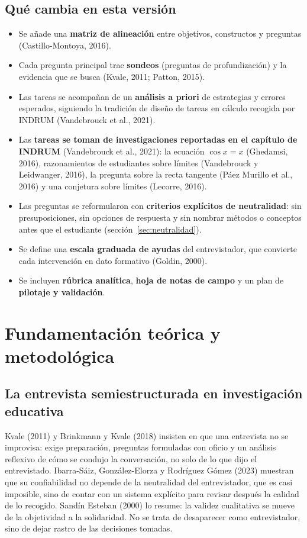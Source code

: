 \documentclass[11pt,letterpaper]{article}
\newcounter{preg}
\begin{document}
\subsection*{Qué cambia en esta versión}
\begin{itemize}
  \item Se añade una \textbf{matriz de alineación} entre objetivos, constructos y preguntas (Castillo-Montoya, 2016).
  \item Cada pregunta principal trae \textbf{sondeos} (preguntas de profundización) y la evidencia que se busca (Kvale, 2011; Patton, 2015).
  \item Las tareas se acompañan de un \textbf{análisis a priori} de estrategias y errores esperados, siguiendo la tradición de diseño de tareas en cálculo recogida por INDRUM (Vandebrouck et al., 2021).
  \item Las \textbf{tareas se toman de investigaciones reportadas en el capítulo de INDRUM} (Vandebrouck et al., 2021): la ecuación $\cos x = x$ (Ghedamsi, 2016), razonamientos de estudiantes sobre límites (Vandebrouck y Leidwanger, 2016), la pregunta sobre la recta tangente (Páez Murillo et al., 2016) y una conjetura sobre límites (Lecorre, 2016).
  \item Las preguntas se reformularon con \textbf{criterios explícitos de neutralidad}: sin presuposiciones, sin opciones de respuesta y sin nombrar métodos o conceptos antes que el estudiante (sección~\ref{sec:neutralidad}).
  \item Se define una \textbf{escala graduada de ayudas} del entrevistador, que convierte cada intervención en dato formativo (Goldin, 2000).
  \item Se incluyen \textbf{rúbrica analítica}, \textbf{hoja de notas de campo} y un plan de \textbf{pilotaje y validación}.
\end{itemize}

\section{Fundamentación teórica y metodológica}

\subsection{La entrevista semiestructurada en investigación educativa}
Kvale (2011) y Brinkmann y Kvale (2018) insisten en que una entrevista no se improvisa: exige preparación, preguntas formuladas con oficio y un análisis reflexivo de cómo se condujo la conversación, no solo de lo que dijo el entrevistado. Ibarra-Sáiz, González-Elorza y Rodríguez Gómez (2023) muestran que su confiabilidad no depende de la neutralidad del entrevistador, que es casi imposible, sino de contar con un sistema explícito para revisar después la calidad de lo recogido. Sandín Esteban (2000) lo resume: la validez cualitativa se mueve de la objetividad a la solidaridad. No se trata de desaparecer como entrevistador, sino de dejar rastro de las decisiones tomadas.
\end{document}
